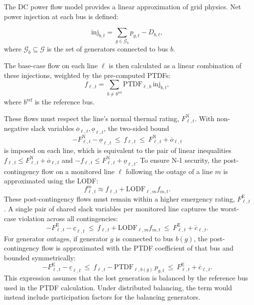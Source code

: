 \documentclass[runningheads]{llncs}
\begin{document}
The DC power flow model provides a linear approximation of grid physics. Net power injection at each bus is defined:

\begin{equation}
\mathrm{inj}_{b,t}=\sum_{g\in\mathcal{G}_b} p_{g,t} - D_{b,t},
\end{equation}
where $\mathcal{G}_b \subseteq \mathcal{G}$ is the set of generators connected to bus $b$.

The base-case flow on each line $\ell$ is then calculated as a linear combination of these injections, weighted by the pre-computed PTDFs:
\begin{equation}
f_{\ell,t}=\sum_{b\neq b^{\mathrm{ref}}}\mathrm{PTDF}_{\ell,b}\,\mathrm{inj}_{b,t},
\label{eq:flow-def}
\end{equation}
where $b^{\mathrm{ref}}$ is the reference bus.

These flows must respect the line's normal thermal rating, $F^{\mathrm{N}}_{\ell,t}$. With non-negative slack variables $\overline{o}_{\ell,t},\underline{o}_{\ell,t}$, the two-sided bound
\begin{equation}
-F^{\mathrm{N}}_{\ell,t}-\underline{o}_{\ell,t} \ \le\ f_{\ell,t}\ \le\ F^{\mathrm{N}}_{\ell,t}+\overline{o}_{\ell,t}
\label{eq:base-lims}
\end{equation}
is imposed on each line, which is equivalent to the pair of linear inequalities $f_{\ell,t}\le F^{\mathrm{N}}_{\ell,t}+\overline{o}_{\ell,t}$ and $-f_{\ell,t}\le F^{\mathrm{N}}_{\ell,t}+\underline{o}_{\ell,t}$.
To ensure N-1 security, the post-contingency flow on a monitored line $\ell$ following the outage of a line $m$ is approximated using the LODF:
\begin{equation}
f_{\ell,t}^{m} \approx f_{\ell,t}+\mathrm{LODF}_{\ell,m}f_{m,t}. \label{eq:lodf}
\end{equation}
These post-contingency flows must remain within a higher emergency rating, $F^{\mathrm{E}}_{\ell,t}$. A single pair of shared slack variables per monitored line captures the worst-case violation across all contingencies:
\begin{equation}
-F^{\mathrm{E}}_{\ell,t}-\underline{c}_{\ell,t}\ \le\ f_{\ell,t}+\mathrm{LODF}_{\ell,m}f_{m,t}\ \le\ F^{\mathrm{E}}_{\ell,t}+\overline{c}_{\ell,t}.
\label{eq:cont-line}
\end{equation}
For generator outages, if generator $g$ is connected to bus $b(g)$, the post-contingency flow is approximated with the PTDF coefficient of that bus and bounded symmetrically:
\begin{equation}
-F^{\mathrm{E}}_{\ell,t}-\underline{c}_{\ell,t}\ \le\ f_{\ell,t}-\mathrm{PTDF}_{\ell,b(g)}\,p_{g,t}\ \le\ F^{\mathrm{E}}_{\ell,t}+\overline{c}_{\ell,t}.
\label{eq:cont-gen}
\end{equation}
This expression assumes that the lost generation is balanced by the reference bus used in the PTDF calculation. Under distributed balancing, the term would instead include participation factors for the balancing generators.
\end{document}
